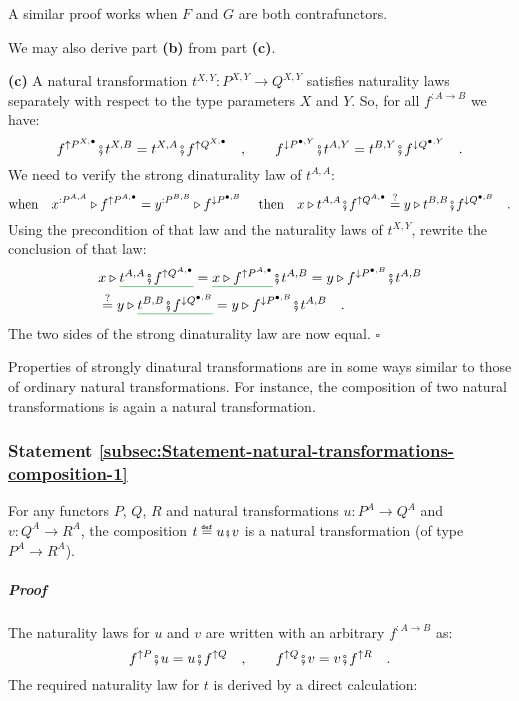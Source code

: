 A similar proof works when $F$ and $G$ are both contrafunctors.

We may also derive part \textbf{(b)} from part \textbf{(c)}.

\textbf{(c)} A natural transformation $t^{X,Y}:P^{X,Y}\rightarrow Q^{X,Y}$
satisfies naturality laws separately with respect to the type parameters
$X$ and $Y$. So, for all $f^{:A\rightarrow B}$ we have:
\[
f^{\uparrow P^{X,\bullet}}\bef t^{X,B}=t^{X,A}\bef f^{\uparrow Q^{X,\bullet}}\quad,\quad\quad f^{\downarrow P^{\bullet,Y}}\bef t^{A,Y}=t^{B,Y}\bef f^{\downarrow Q^{\bullet,Y}}\quad.
\]
We need to verify the strong dinaturality law of $t^{A,A}$:
\[
\text{when}\quad x^{:P^{A,A}}\triangleright f^{\uparrow P^{A,\bullet}}=y^{:P^{B,B}}\triangleright f^{\downarrow P^{\bullet,B}}\quad\text{ then}\quad x\triangleright t^{A,A}\bef f^{\uparrow Q^{A,\bullet}}\overset{?}{=}y\triangleright t^{B,B}\bef f^{\downarrow Q^{\bullet,B}}\quad.
\]
Using the precondition of that law and the naturality laws of $t^{X,Y}$,
rewrite the conclusion of that law:
\begin{align*}
 & x\triangleright\gunderline{t^{A,A}\bef f^{\uparrow Q^{A,\bullet}}}=\gunderline{x\triangleright f^{\uparrow P^{A,\bullet}}}\bef t^{A,B}=y\triangleright f^{\downarrow P^{\bullet,B}}\bef t^{A,B}\\
 & \overset{?}{=}y\triangleright\gunderline{t^{B,B}\bef f^{\downarrow Q^{\bullet,B}}}=y\triangleright f^{\downarrow P^{\bullet,B}}\bef t^{A,B}\quad.
\end{align*}
The two sides of the strong dinaturality law are now equal. $\square$

Properties of strongly dinatural transformations are in some ways
similar to those of ordinary natural transformations. For instance,
the composition of two natural transformations is again a natural
transformation.

\subsubsection{Statement \label{subsec:Statement-natural-transformations-composition-1}\ref{subsec:Statement-natural-transformations-composition-1}}

For any functors $P$, $Q$, $R$ and natural transformations $u:P^{A}\rightarrow Q^{A}$
and $v:Q^{A}\rightarrow R^{A}$, the composition $t\triangleq u\bef v$
is a natural transformation (of type $P^{A}\rightarrow R^{A}$).

\subparagraph{Proof}

The naturality laws for $u$ and $v$ are written with an arbitrary
$f^{:A\rightarrow B}$ as:
\[
f^{\uparrow P}\bef u=u\bef f^{\uparrow Q}\quad,\quad\quad f^{\uparrow Q}\bef v=v\bef f^{\uparrow R}\quad.
\]
The required naturality law for $t$ is derived by a direct calculation:

